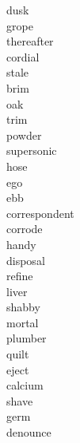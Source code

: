 \documentclass[b5paper, 11pt]{ctexart}
\begin{document}
\begin{multicols*}{3}
\begin{description}
\item[dusk]

\item[grope]

\item[thereafter]

\item[cordial]

\item[stale]

\item[brim]

\item[oak]

\item[trim]

\item[powder]

\item[supersonic]

\item[hose]

\item[ego]

\item[ebb]

\item[correspondent]

\item[corrode]

\item[handy]

\item[disposal]

\item[refine]

\item[liver]

\item[shabby]

\item[mortal]

\item[plumber]

\item[quilt]

\item[eject]

\item[calcium]

\item[shave]

\item[germ]

\item[denounce]


\end{description}
\end{multicols*}
\end{document}
